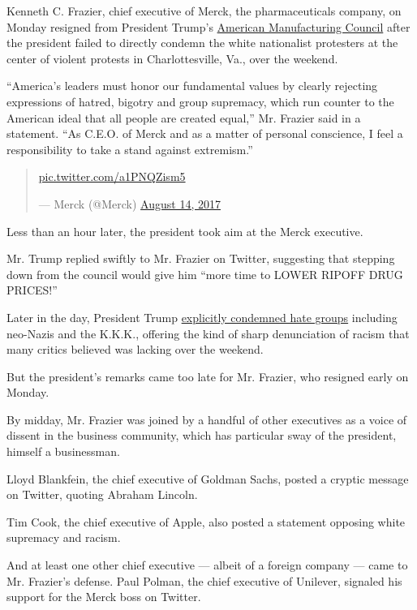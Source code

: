 Kenneth C. Frazier, chief executive of Merck, the pharmaceuticals
company, on Monday resigned from President Trump's
\href{https://www.whitehouse.gov/the-press-office/2017/01/27/president-trump-announces-manufacturing-jobs-initiative}{American
Manufacturing Council} after the president failed to directly condemn
the white nationalist protesters at the center of violent protests in
Charlottesville, Va., over the weekend.

``America's leaders must honor our fundamental values by clearly
rejecting expressions of hatred, bigotry and group supremacy, which run
counter to the American ideal that all people are created equal,'' Mr.
Frazier said in a statement. ``As C.E.O. of Merck and as a matter of
personal conscience, I feel a responsibility to take a stand against
extremism.''

\begin{quote}
\href{https://t.co/a1PNQZism5}{pic.twitter.com/a1PNQZism5}

--- Merck (@Merck)
\href{https://twitter.com/Merck/status/897065338566791169?ref_src=twsrc\%5Etfw}{August
14, 2017}
\end{quote}

Less than an hour later, the president took aim at the Merck executive.

Mr. Trump replied swiftly to Mr. Frazier on Twitter, suggesting that
stepping down from the council would give him ``more time to LOWER
RIPOFF DRUG PRICES!''

Later in the day, President Trump
\href{https://www.nytimes3xbfgragh.onion/2017/08/14/us/politics/trump-charlottesville-protest.html}{explicitly
condemned hate groups} including neo-Nazis and the K.K.K., offering the
kind of sharp denunciation of racism that many critics believed was
lacking over the weekend.

But the president's remarks came too late for Mr. Frazier, who resigned
early on Monday.

By midday, Mr. Frazier was joined by a handful of other executives as a
voice of dissent in the business community, which has particular sway of
the president, himself a businessman.

Lloyd Blankfein, the chief executive of Goldman Sachs, posted a cryptic
message on Twitter, quoting Abraham Lincoln.

Tim Cook, the chief executive of Apple, also posted a statement opposing
white supremacy and racism.

And at least one other chief executive --- albeit of a foreign company
--- came to Mr. Frazier's defense. Paul Polman, the chief executive of
Unilever, signaled his support for the Merck boss on Twitter.

